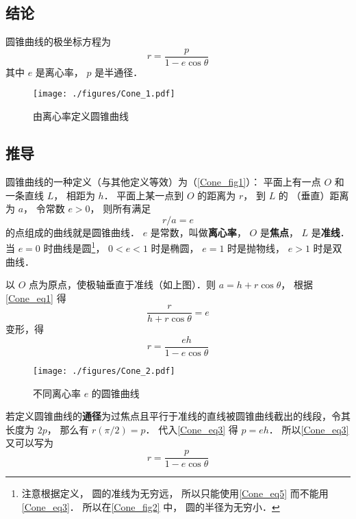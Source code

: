 

\subsection{结论}
圆锥曲线的极坐标方程为
\begin{equation}\label{Cone_eq5}
r  = \frac{p}{1 - e\cos \theta }
\end{equation}
其中 $e$ 是离心率， $p$ 是半通径．

\begin{figure}[ht]
\centering
\texttt{[image: ./figures/Cone\_1.pdf]}
\caption{由离心率定义圆锥曲线}\label{Cone_fig1}
\end{figure}

\subsection{推导}
圆锥曲线的一种定义（与其他定义等效）为（\autoref{Cone_fig1}）：
平面上有一点 $O$ 和一条直线 $L$， 相距为 $h$． 
平面上某一点到 $O$ 的距离为 $r$， 到 $L$ 的
（垂直）距离为 $a$， 令常数 $e > 0$， 则所有满足
\begin{equation}\label{Cone_eq1}
r/a = e
\end{equation}
的点组成的曲线就是圆锥曲线． $e$ 是常数，叫做\textbf{离心率}， $O$ 是\textbf{焦点}， $L$ 是\textbf{准线}． 当 $e = 0$ 时曲线是圆\footnote{注意根据定义， 圆的准线为无穷远， 所以只能使用\autoref{Cone_eq5} 而不能用\autoref{Cone_eq3}． 所以在\autoref{Cone_fig2} 中， 圆的半径为无穷小．}， $0 < e < 1$ 时是椭圆， $e = 1$ 时是抛物线， $e > 1$ 时是双曲线．

以 $O$ 点为原点，使极轴垂直于准线（如上图）．则 $a = h + r \cos \theta $， 根据\autoref{Cone_eq1} 得
\begin{equation}\label{Cone_eq2}
\frac{r}{h + r \cos \theta } = e
\end{equation}
变形，得
\begin{equation}\label{Cone_eq3}
r = \frac{eh}{1 - e\cos \theta }
\end{equation}

\begin{figure}[ht]
\centering
\texttt{[image: ./figures/Cone\_2.pdf]}
\caption{不同离心率 $e$ 的圆锥曲线} \label{Cone_fig2}
\end{figure}

若定义圆锥曲线的\textbf{通径}为过焦点且平行于准线的直线被圆锥曲线截出的线段，令其长度为 $2p$， 那么有 $r(\pi /2) = p$． 代入\autoref{Cone_eq3} 得 $p = eh$． 所以\autoref{Cone_eq3} 又可以写为
\begin{equation}\label{Cone_eq4}
r  = \frac{p}{1 - e\cos \theta }
\end{equation}


